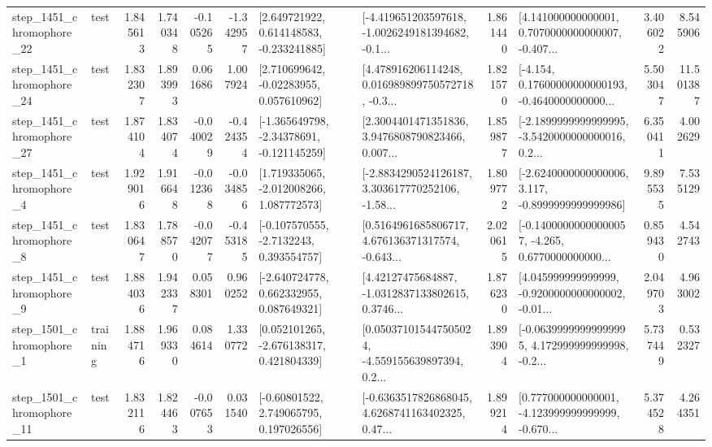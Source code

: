 \begin{tabular}{llrrrrllrlrr}
 step\_1451\_chromophore\_22 &      test &      1.845613 &    1.740348 &     -0.105265 & -1.342957 &    [2.649721922, 0.614148583, -0.233241885] &  [-4.419651203597618, -1.0026249181394682, -0.1... &       1.861440 &  [4.141000000000001, 0.7070000000000007, -0.407... &            3.406022 &          8.545906 \\
 step\_1451\_chromophore\_24 &      test &      1.832307 &    1.893993 &      0.061686 &  1.007924 &     [2.710699642, -0.02283955, 0.057610962] &  [4.478916206114248, 0.016989899750572718, -0.3... &       1.821570 &  [-4.154, 0.17600000000000193, -0.4640000000000... &            5.503047 &         11.501387 \\
 step\_1451\_chromophore\_27 &      test &      1.874104 &    1.834074 &     -0.040029 & -0.424354 &   [-1.365649798, -2.34378691, -0.121145259] &  [2.3004401471351836, 3.9476808790823466, 0.007... &       1.859877 &  [-2.1899999999999995, -3.5420000000000016, 0.2... &            6.350411 &          4.002629 \\
  step\_1451\_chromophore\_4 &      test &      1.929016 &    1.916648 &     -0.012368 & -0.034856 &    [1.719335065, -2.012008266, 1.087772573] &  [-2.8834290524126187, 3.303617770252106, -1.58... &       1.809772 &  [-2.6240000000000006, 3.117, -0.8999999999999986] &            9.895535 &          7.535129 \\
  step\_1451\_chromophore\_8 &      test &      1.830647 &    1.788570 &     -0.042077 & -0.453185 &     [-0.107570555, -2.7132243, 0.393554757] &  [0.5164961685806717, 4.676136371317574, -0.643... &       2.020615 &  [-0.14000000000000057, -4.265, 0.6770000000000... &            0.859430 &          4.542743 \\
  step\_1451\_chromophore\_9 &      test &      1.884036 &    1.942337 &      0.058301 &  0.960252 &    [-2.640724778, 0.662332955, 0.087649321] &  [4.42127475684887, -1.0312837133802615, 0.3746... &       1.876230 &  [4.045999999999999, -0.9200000000000002, -0.01... &            2.049703 &          4.963002 \\
  step\_1501\_chromophore\_1 &  training &      1.884716 &    1.969330 &      0.084614 &  1.330772 &    [0.052101265, -2.676138317, 0.421804339] &  [0.050371015447505024, -4.559155639897394, 0.2... &       1.893904 &  [-0.06399999999999995, 4.172999999999998, -0.2... &            5.737449 &          0.532327 \\
 step\_1501\_chromophore\_11 &      test &      1.832116 &    1.824463 &     -0.007653 &  0.031540 &     [-0.60801522, 2.749065795, 0.197026556] &  [-0.6363517826868045, 4.6268741163402325, 0.47... &       1.899214 &  [0.777000000000001, -4.123999999999999, -0.670... &            5.374528 &          4.264351 \\

\end{tabular}

